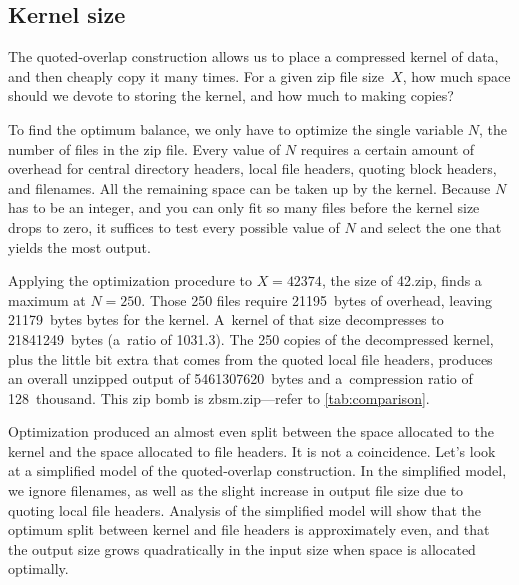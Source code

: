 \documentclass[letterpaper,twocolumn,10pt]{article}
\begin{document}

\subsection{Kernel size}
\label{sec:allocation}

The quoted-overlap construction
allows us to place a compressed kernel of data,
and then cheaply copy it many times.
For a given zip file size~$X$,
how much space should we devote to storing the kernel,
and how much to making copies?

To find the optimum balance,
we only have to optimize the single variable $N$,
the number of files in the zip file.
Every value of $N$ requires
a certain amount of overhead for
central directory headers,
local file headers,
quoting block headers, and filenames.
All the remaining space can be taken up by the kernel.
Because $N$ has to be an integer,
and you can only fit so many files
before the kernel size drops to zero,
it suffices to test every possible value of $N$
and select the one that yields the most output.

Applying the optimization procedure to $X = \num{42374}$,
the size of 42.zip,
finds a maximum at $N = 250$.
Those \num{250} files require \SI{21195}{bytes} of overhead,
leaving \SI{21179}{bytes} bytes for the kernel.
A~kernel of that size decompresses to \SI{21841249}{bytes}
(a~ratio of \num{1031.3}).
The \num{250} copies of the decompressed kernel,
plus the little bit extra that comes from the quoted local file headers,
produces an overall unzipped output of
\SI{5461307620}{bytes}
and a~compression ratio of 128~thousand.
This zip bomb is \mbox{zbsm.zip}---refer to \autoref{tab:comparison}.

Optimization produced an almost even split
between the space allocated to the kernel
and the space allocated to file headers.
It is not a coincidence.
Let's look at a simplified model of the quoted-overlap construction.
In the simplified model,
we ignore filenames,
as well as the slight increase in output file size
due to quoting local file headers.
Analysis of the simplified model will show that the optimum
split between kernel and file headers is approximately even,
and that the output size grows quadratically in the input size
when space is allocated optimally.
\end{document}
